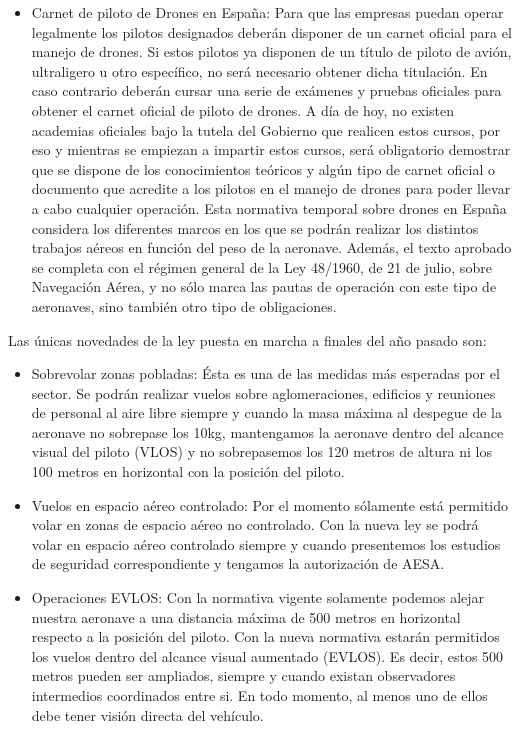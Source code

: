 \begin{itemize}
		\item Carnet de piloto de Drones en España: Para que las empresas puedan operar legalmente los pilotos designados deberán disponer de un carnet oficial para el manejo de drones. Si estos pilotos ya disponen de un título de piloto de avión, ultraligero u otro específico, no será necesario obtener dicha titulación. En caso contrario deberán cursar una serie de exámenes y pruebas oficiales para obtener el carnet oficial de piloto de drones. A día de hoy, no existen academias oficiales bajo la tutela del Gobierno que realicen estos cursos, por eso y mientras se empiezan a impartir estos cursos, será obligatorio demostrar que se dispone de los conocimientos teóricos y algún tipo de carnet oficial o documento que acredite a los pilotos en el manejo de drones para poder llevar a cabo cualquier operación. Esta normativa temporal sobre drones en España considera los diferentes marcos en los que se podrán realizar los distintos trabajos aéreos en función del peso de la aeronave. Además, el texto aprobado se completa con el régimen general de la Ley 48/1960, de 21 de julio, sobre Navegación Aérea, y no sólo marca las pautas de operación con este tipo de aeronaves, sino también otro tipo de obligaciones.
	\end{itemize}
	
\hspace{-1cm} Las únicas novedades de la ley puesta en marcha a finales del año pasado son:

	\begin{itemize}
		\item Sobrevolar zonas pobladas: Ésta es una de las medidas más esperadas por el sector. Se podrán realizar vuelos sobre aglomeraciones, edificios y reuniones de personal al aire libre siempre y cuando la masa máxima al despegue de la aeronave no sobrepase los 10kg, mantengamos la aeronave dentro del alcance visual del piloto (VLOS) y no sobrepasemos los 120 metros de altura ni los 100 metros en horizontal con la posición del piloto.
		\item Vuelos en espacio aéreo controlado: Por el momento sólamente está permitido volar en zonas de espacio aéreo no controlado. Con la nueva ley se podrá volar en espacio aéreo controlado siempre y cuando presentemos los estudios de seguridad correspondiente y tengamos la autorización de AESA.
		\item Operaciones EVLOS: Con la normativa vigente solamente podemos alejar nuestra aeronave a una distancia máxima de 500 metros en horizontal respecto a la posición del piloto. Con la nueva normativa estarán permitidos los vuelos dentro del alcance visual aumentado (EVLOS). Es decir, estos 500 metros pueden ser ampliados, siempre y cuando existan observadores intermedios coordinados entre si. En todo momento, al menos uno de ellos debe tener visión directa del vehículo.
	\end{itemize}	 

